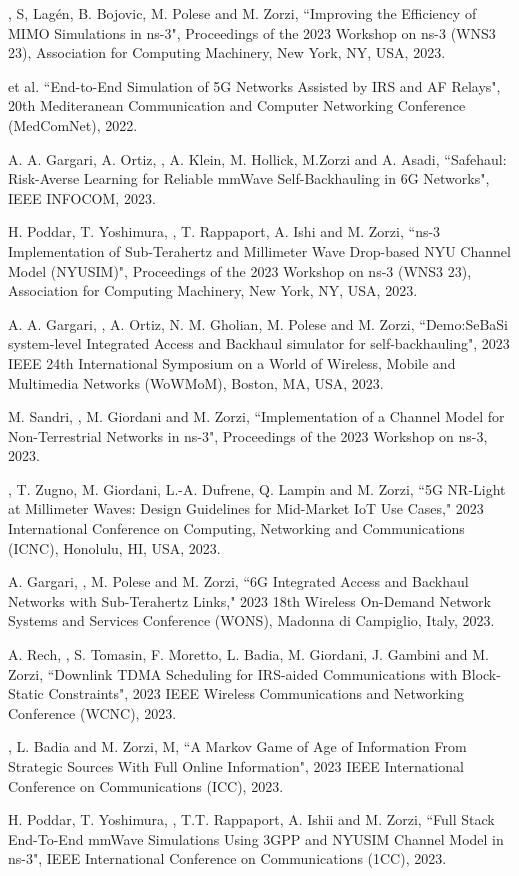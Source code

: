 \begin{enumerate}[label={[C\arabic*]}]
    \item \myself, S, Lagén, B. Bojovic, M. Polese and M. Zorzi, ``Improving the Efficiency of MIMO Simulations in ns-3", Proceedings of the 2023 Workshop on ns-3 (WNS3 23), Association for Computing Machinery, New York, NY, USA, 2023.
    \item \myself{} et al. ``End-to-End Simulation of 5G Networks Assisted by IRS and AF Relays", 20th Mediteranean Communication and Computer Networking Conference (MedComNet), 2022.
    \item A. A. Gargari, A. Ortiz, \myself, A. Klein, M. Hollick, M.Zorzi and A. Asadi, ``Safehaul: Risk-Averse Learning for Reliable mmWave Self-Backhauling in 6G Networks", IEEE INFOCOM, 2023.
    \item H. Poddar, T. Yoshimura, \myself, T. Rappaport, A. Ishi and M. Zorzi, ``ns-3 Implementation of Sub-Terahertz and Millimeter Wave Drop-based NYU Channel Model (NYUSIM)", Proceedings of the 2023 Workshop on ns-3 (WNS3 23), Association for Computing Machinery, New York, NY, USA, 2023.
    \item A. A. Gargari, \myself, A. Ortiz, N. M. Gholian, M. Polese and M. Zorzi, ``Demo:SeBaSi system-level Integrated Access and Backhaul simulator for self-backhauling", 2023 IEEE 24th International Symposium on a World of Wireless, Mobile and Multimedia Networks (WoWMoM), Boston, MA, USA, 2023.
    \item M. Sandri, \myself, M. Giordani and M. Zorzi, ``Implementation of a Channel Model for Non-Terrestrial Networks in ns-3", Proceedings of the 2023 Workshop on ns-3, 2023.
    \item \myself, T. Zugno, M. Giordani, L.-A. Dufrene, Q. Lampin and M. Zorzi, ``5G NR-Light
    at Millimeter Waves: Design Guidelines for Mid-Market IoT Use Cases," 2023 International
    Conference on Computing, Networking and Communications (ICNC), Honolulu, HI, USA, 2023.
    \item A. Gargari, \myself, M. Polese and M. Zorzi, ``6G Integrated Access and Backhaul
    Networks with Sub-Terahertz Links," 2023 18th Wireless On-Demand Network Systems and
    Services Conference (WONS), Madonna di Campiglio, Italy, 2023.
    \item A. Rech, \myself, S. Tomasin, F. Moretto, L. Badia, M. Giordani, J. Gambini and M. Zorzi, ``Downlink TDMA Scheduling for IRS-aided Communications with Block-Static Constraints", 2023 IEEE Wireless Communications and Networking Conference (WCNC), 2023.
    \item \myself, L. Badia and M. Zorzi, M, ``A Markov Game of Age of Information From Strategic Sources With Full Online Information", 2023 IEEE International Conference on Communications (ICC), 2023.
    \item H. Poddar, T. Yoshimura, \myself, T.T. Rappaport, A. Ishii and M. Zorzi, ``Full Stack End-To-End mmWave Simulations Using 3GPP and NYUSIM Channel Model in ns-3", IEEE International Conference on Communications (1CC), 2023.
\end{enumerate}